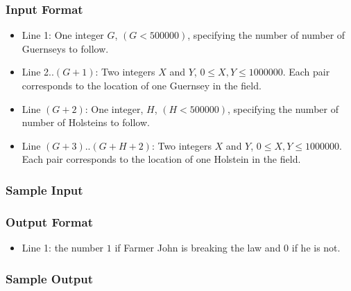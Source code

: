 \subsubsection{Input Format}
\begin{itemize}
	\item Line 1: One integer $G$, $(G < 500000)$, specifying the number of number of Guernseys to follow.
	\item Line 2..$(G+1)$: Two integers $X$ and $Y$, $0 \leq X,Y \leq 1000000$.
		Each pair corresponds to the location of one Guernsey in the field.
	\item Line $(G+2)$: One integer, $H$, $(H < 500000)$, specifying the number of number of Holsteins to follow. 
	\item Line $(G+3)$..$(G+H+2)$: Two integers $X$ and $Y$, $0 \leq X,Y \leq 1000000$.
		Each pair corresponds to the location of one Holstein in the field.
\end{itemize}

\subsubsection{Sample Input}

\subsubsection{Output Format}
\begin{itemize}
	\item Line 1: the number $1$ if Farmer John is breaking the law and $0$ if he is not.
\end{itemize}

\subsubsection{Sample Output}

